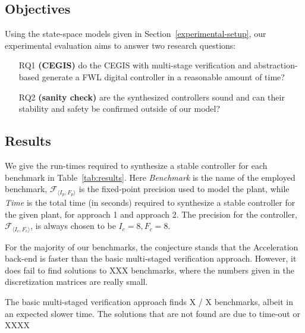 \documentclass[runningheads,a4paper]{llncs}
\begin{document}
\subsection{Objectives}

Using the state-space models given in Section~\ref{experimental-setup}, 
our experimental evaluation aims to answer two research questions:
%
\begin{enumerate}

\item[RQ1] \textbf{(CEGIS)} do the CEGIS with multi-stage 
verification and abstraction-based generate a FWL digital 
controller in a reasonable amount of time?

\item[RQ2] \textbf{(sanity check)} are the synthesized controllers sound
and can their stability and safety be confirmed outside of our model?

\end{enumerate}


\subsection{Results}

We give the run-times required to synthesize a stable controller for each
benchmark in Table~\ref{tab:results}.  
Here \textit{Benchmark} is the name of the employed
benchmark, $\mathcal{F}_{\langle I_p,F_p \rangle}$ is the fixed-point precision used to model the plant, while \textit{Time}
is the total time (in seconds) required to synthesize a stable controller
for the given plant, for approach 1 and approach 2. The precision for the controller, $\mathcal{F}_{\langle I_c,F_c \rangle}$, is always chosen to be $I_c = 8, F_c = 8$.

For the majority of our benchmarks, the conjecture stands that the Acceleration back-end is faster than the basic multi-staged verification approach. However, it does fail to find solutions to XXX benchmarks, where the numbers given in the discretization matrices are really small.  

The basic multi-staged verification approach finds X / X benchmarks, albeit in an expected slower time. The solutions that are not found are due to time-out or XXXX
\end{document}
